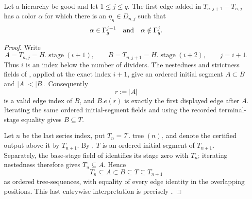 \begin{lemma}
Let a hierarchy be good and let $1\le j\le q$.  The first edge added in
$T_{n,j+1}-T_{n,j}$ has a color $\alpha$ for which there is an
$\eta_g\in D_{n,j}$ such that
\[
             \alpha\in\Gamma^{j-1}_{g}
             \quad\hbox{and}\quad
             \alpha\notin\Gamma^{j}_{g}.
\]
\end{lemma}
\begin{proof}
Write
\[
 A=T_{n,j}=H.\operatorname{stage}(i+1),\qquad
 B=T_{n,j+1}=H.\operatorname{stage}(i+2),
 \qquad j=i+1.
\]
Thus $i$ is an index below the number of dividers.  The nestedness and
strictness fields of , applied at the exact
index $i+1$, give an ordered initial segment $A\subset B$ and
$|A|<|B|$.  Consequently
\[
                  r:=|A|
\]
is a valid edge index of $B$, and $B.e(r)$ is exactly the first displayed
edge after $A$.  Iterating the same ordered initial-segment fields and
using the recorded terminal-stage equality gives $B\subseteq T$.

Let $n$ be the last series index, put
$T_n=\mathcal T.\operatorname{tree}(n)$, and denote the certified output
above it by $T_{n+1}$.  By , $T$ is an
ordered initial segment of $T_{n+1}$.  Separately, the base-stage field
of  identifies its stage zero with $T_n$;
iterating nestedness therefore gives $T_n\subseteq A$.  Hence
\[
             T_n\subseteq A\subset B\subseteq T\subseteq T_{n+1}
\tag{1}
\]
as ordered tree-sequences, with equality of every edge identity in the
overlapping positions.  This last entrywise interpretation is precisely
.


\end{proof}
